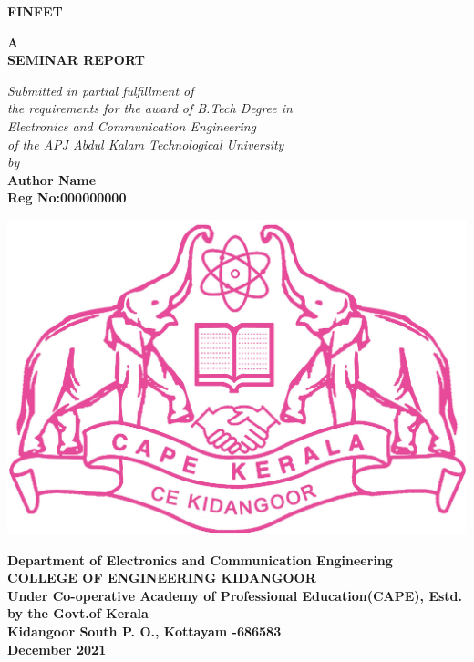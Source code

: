 \begin{titlepage}
    \begin{center}
        \vspace*{0.5cm}
        
        \Large
        \textbf{\uppercase{finfet}}
        
        \vspace{2cm}
        \normalsize
        \textbf{\uppercase{a\\seminar report}}      
        \vspace{1cm}
        
        \textit{        
        Submitted in partial fulfillment of\\
		the requirements for the award of B.Tech Degree in\\
		Electronics and Communication Engineering\\
		of the APJ Abdul Kalam Technological University\\
		\vspace{1cm}
		by \\}
		\vspace{1cm}
        \large
 		\textbf{Author Name}\\ 
 		\textbf{Reg No:000000000}     
        
        \vspace{2cm}
		\includegraphics[scale=0.2]{frontpages/ceklogo.jpg} 
       
        \large 
        \textbf{
        Department of Electronics and Communication Engineering\\[0.5cm]
        \Large COLLEGE OF ENGINEERING KIDANGOOR\\
        \scriptsize Under Co-operative Academy of Professional Education(CAPE), Estd. by the Govt.of Kerala\\
        \large Kidangoor South P. O., Kottayam -686583\\
        December 2021}\\
        
        
        
    \end{center}
\end{titlepage}